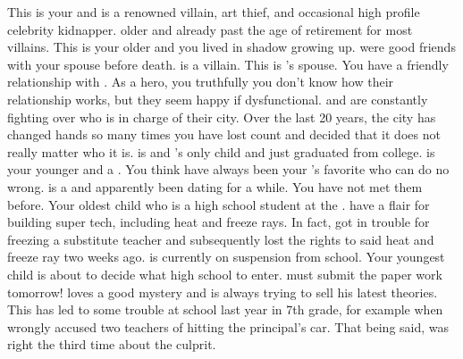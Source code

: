 \documentclass[char]{LRSguildcamp1}
\begin{document}
\begin{itemz}[Notes]
	\item 
\end{itemz}



\begin{contacts}
	\contact{\cGrandma{}} This is your \cGrandma{\parent} and is a renowned villain, art thief, and occasional high profile celebrity kidnapper. \cGrandma{\Theyare} older and already past the age of retirement for most villains.
	\contact{\cOldest{}} This is your older \cOldest{\sibling} and you lived in \cOldest{\their} shadow growing up. \cOldest{\They} were good friends with your spouse before \cAS{\their} death. \cOldest{} is a villain. 
	\contact{\cOS{}} This is \cOldest{}'s spouse. You have a friendly relationship with \cOS{\them}. As a hero, you truthfully you don't know how their relationship works, but they seem happy if dysfunctional.  \cOldest{} and \cOS{} are constantly fighting over who is in charge of their city.  Over the last 20 years, the city has changed hands so many times you have lost count and decided that it does not really matter who it is. 
	\contact{\cGrad{}} \cGrad{} is \cOldest{} and \cOS{}'s only child and just graduated from college. 
	\contact{\cYoungest{}} \cYoungest{} is your younger \cYoungest{\sibling} and a \cYoungest{\hero}. You think  have always been your \cGrandma{\parent}'s favorite who can do no wrong. 
	\contact{\cYS{}} \cYS{} is a \cYS{\hero} and apparently been dating \cYoungest{} for a while. You have not met them before. 
	\contact{\cTeen{}} Your oldest child who is a high school student at the \pNormalSchool{}. \cTeen{\They} have a flair for building super tech, including heat and freeze rays. In fact, \cTeen{} got in trouble for freezing a substitute teacher and subsequently lost the rights to said heat and freeze ray two weeks ago. \cTeen{} is currently on suspension from school.
	\contact{\cTween{}} Your youngest child is about to decide what high school to enter. \cTween{} must submit the paper work tomorrow! \cTween{} loves a good mystery and is always trying to sell his latest theories. This has led to some trouble at school last year in 7th grade, for example when \cTween{\they} wrongly accused two teachers of hitting the principal's car. That being said, \cTween{\they} was right the third time about the culprit.
\end{contacts}
\end{document}
